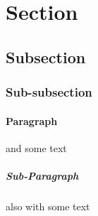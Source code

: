 \section{Section}
\subsection{Subsection}
\subsubsection{Sub-subsection}
\paragraph{Paragraph} and some text
\subparagraph{Sub-Paragraph} also with some text
